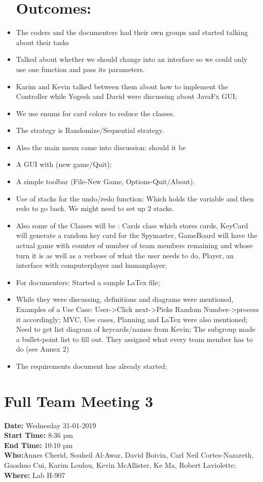 \documentclass[12pt]{article}
\begin{document}
\begin{itemize}
\section{Outcomes:} 
\item The coders and the documenters had their own groups and started talking about their tasks
\item Talked about whether we should change into an interface so we could only use one function and pass its parameters.
\item Karim and Kevin talked between them about how to implement the Controller while Yogesh and David were discussing about JavaFx GUI;
\item We use enums for card colors to reduce the classes.
\item The strategy is Randomize/Sequential strategy.
\item Also the main menu came into discussion: should it be
\item A GUI with (new game/Quit);
\item A simple toolbar (File-New Game, Options-Quit/About).
\item Use of stacks for the undo/redo function: Which holds the variable and then redo to go back. We might need to set up 2 stacks.
\item Also some of the Classes will be : Cards class which stores cards, KeyCard will generate a random key card for the Spymaster, GameBoard will have the actual game with counter of number of team members remaining and whose turn it is as well as a verbose of what the user needs to do, Player, an interface with computerplayer and humanplayer;
\item For documenters: Started a sample LaTex file;
\item While they were discussing, definitions and diagrams were mentioned, Examples of a Use Case: User->Click next->Picks Random Number->process it accordingly; MVC, Use cases, Planning and LaTex were also mentioned; Need to get list diagram of keycards/names from Kevin; The subgroup made a bullet-point list to fill out. They assigned what every team member has to do (see Annex 2)
\item The requirements document has already started;


\end {itemize}
\clearpage

\section {Full Team Meeting 3}
{\bf Date:} Wednesday 31-01-2019\\
{\bf Start Time:} 8:36 pm\\
{\bf End Time:} 10:10 pm \\
{\bf Who:}Annes Cherid, Souheil Al-Awar, David Boivin, Carl Neil Cortes-Nazareth, Gaoshuo Cui, Karim	Loulou, Kevin McAllister, Ke Ma, Robert Laviolette;   \\
{\bf Where:} Lab H-907 \\
\end{document}
